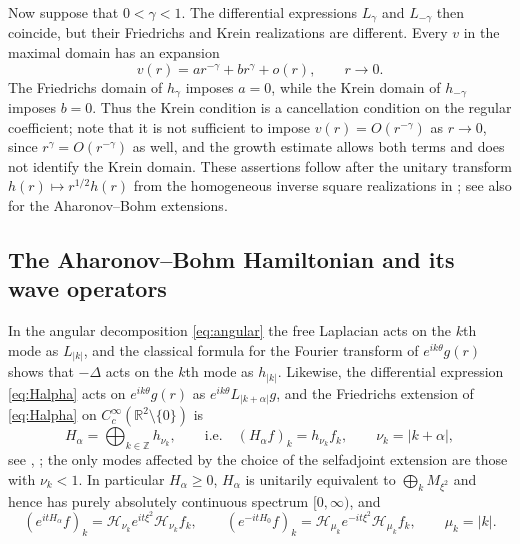 \documentclass[11pt,a4paper,reqno,backref=page]{amsart}
\newcommand{\R}{\mathbb R}
\newcommand{\Z}{\mathbb Z}
\newcommand{\HH}{\mathcal H}                 %
\numberwithin{equation}{section}
\theoremstyle{definition}
\theoremstyle{remark}
\begin{document}
Now suppose that $0<\gamma<1$. The differential expressions
$L_\gamma$ and $L_{-\gamma}$ then coincide, but their
Friedrichs and Krein realizations are different. Every $v$ in
the maximal domain has an expansion
\begin{equation*}
  v(r)=a r^{-\gamma}+b r^\gamma+o(r),\qquad r\to0.
\end{equation*}
The Friedrichs domain of $h_\gamma$ imposes $a=0$, while the
Krein domain of $h_{-\gamma}$ imposes $b=0$. Thus the Krein
condition is a cancellation condition on the regular
coefficient; note that it is not sufficient to impose
$v(r)=O(r^{-\gamma})$ as $r\to0$, since
$r^\gamma=O(r^{-\gamma})$ as well, and the growth estimate
allows both terms and does not identify
the Krein domain.
These assertions follow after the unitary transform
$h(r)\mapsto r^{1/2}h(r)$ from the homogeneous inverse square
realizations in \cite[\S2.3]{DerezinskiRichard2017}; see also
\cite[Sections~3--4]{Fermi2024} for the Aharonov--Bohm
extensions.

\subsection{The Aharonov--Bohm Hamiltonian and
its wave operators}
In the angular decomposition \eqref{eq:angular} the free
Laplacian acts on the $k$th mode as $L_{|k|}$, and the
classical formula for the Fourier transform of
$e^{ik\theta}g(r)$ \cite[Ch.~IV, Thm.~3.10]{SteinWeiss1971}
shows that $-\Delta$ acts on the $k$th mode as $h_{|k|}$.
Likewise, the differential expression \eqref{eq:Halpha} acts on
$e^{ik\theta}g(r)$ as $e^{ik\theta}L_{|k+\alpha|}g$, and the
Friedrichs extension of \eqref{eq:Halpha} on
$C_c^\infty(\R^2\setminus\{0\})$ is
\begin{equation}\label{eq:Halpha-def}
  H_\alpha=\bigoplus_{k\in\Z}h_{\nu_k},\qquad
  \text{i.e.}\quad (H_\alpha f)_k=h_{\nu_k}f_k,
  \qquad
  \nu_{k}=|k+\alpha|,
\end{equation}
see \cite[\S2 and Appendix~A]{Ruijsenaars1983},
\cite[\S\S2--3]{PankrashkinRichard2011}; the only modes affected
by the choice of the selfadjoint extension are those with
$\nu_k<1$. In particular $H_\alpha\ge0$, $H_\alpha$ is unitarily
equivalent to $\bigoplus_kM_{\xi^2}$ and hence has purely
absolutely continuous spectrum $[0,\infty)$, and
\begin{equation}\label{eq:evolutions}
  (e^{itH_\alpha}f)_k=\HH_{\nu_k}e^{it\xi^2}\HH_{\nu_k}f_k,\qquad
  (e^{-itH_0}f)_k=\HH_{\mu_k}e^{-it\xi^2}\HH_{\mu_k}f_k,\qquad
  \mu_{k}=|k|.
\end{equation}
\end{document}
